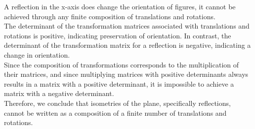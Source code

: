\documentclass[letter,12pt]{article}
\begin{document}
A reflection in the x-axis does change the orientation of figures, it cannot be achieved through any finite composition of translations and rotations.\\

The determinant of the transformation matrices associated with translations and rotations is positive, indicating preservation of orientation. In contrast, the determinant of the transformation matrix for a reflection is negative, indicating a change in orientation. \\

Since the composition of transformations corresponds to the multiplication of their matrices, and since multiplying matrices with positive determinants always results in a matrix with a positive determinant, it is impossible to achieve a matrix with a negative determinant.\\

Therefore, we conclude that isometries of the plane, specifically reflections, cannot be written as a composition of a finite number of translations and rotations.
\pagebreak
\end{document}
